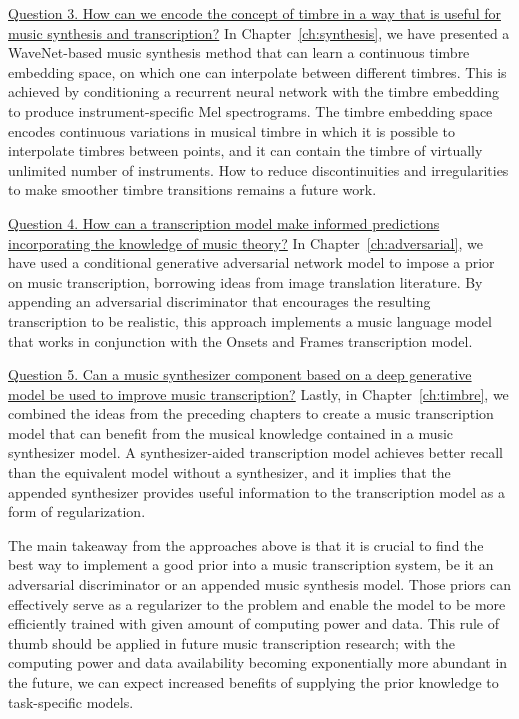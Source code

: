 \uline{Question 3. How can we encode the concept of timbre in a way that is useful for music synthesis and transcription?}
In Chapter~\ref{ch:synthesis}, we have presented a WaveNet-based music synthesis method that can learn a continuous timbre embedding space, on which one can interpolate between different timbres.
This is achieved by conditioning a recurrent neural network with the timbre embedding to produce instrument-specific Mel spectrograms.
The timbre embedding space encodes continuous variations in musical timbre in which it is possible to interpolate timbres between points, and it can contain the timbre of virtually unlimited number of instruments.
How to reduce discontinuities and irregularities to make smoother timbre transitions remains a future work.

\uline{Question 4. How can a transcription model make informed predictions incorporating the knowledge of music theory?}
In Chapter~\ref{ch:adversarial}, we have used a conditional generative adversarial network model to impose a prior on music transcription, borrowing ideas from image translation literature.
By appending an adversarial discriminator that encourages the resulting transcription to be realistic, this approach implements a music language model that works in conjunction with the Onsets and Frames transcription model.

\uline{Question 5. Can a music synthesizer component based on a deep generative model be used to improve music transcription?}
Lastly, in Chapter~\ref{ch:timbre}, we combined the ideas from the preceding chapters to create a music transcription model that can benefit from the musical knowledge contained in a music synthesizer model.
A synthesizer-aided transcription model achieves better recall than the equivalent model without a synthesizer, and it implies that the appended synthesizer provides useful information to the transcription model as a form of regularization.


The main takeaway from the approaches above is that it is crucial to find the best way to implement a good prior into a music transcription system, be it an adversarial discriminator or an appended music synthesis model.
Those priors can effectively serve as a regularizer to the problem and enable the model to be more efficiently trained with given amount of computing power and data.
This rule of thumb should be applied in future music transcription research; with the computing power and data availability becoming exponentially more abundant in the future, we can expect increased benefits of supplying the prior knowledge to task-specific models.



